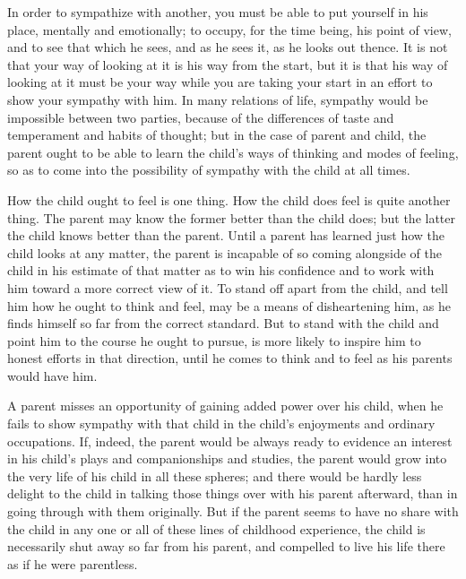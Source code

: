 \documentclass[
]{book}
\begin{document}
In order to sympathize with another, you must be able to put yourself in his place, mentally and emotionally; to occupy, for the time being, his point of view, and to see that which he sees, and as he sees it, as he looks out thence. It is not that your way of looking at it is his way from the start, but it is that his way of looking at it must be your way while you are taking your start in an effort to show your sympathy with him. In many relations of life, sympathy would be impossible between two parties, because of the differences of taste and temperament and habits of thought; but in the case of parent and child, the parent ought to be able to learn the child's ways of thinking and modes of feeling, so as to come into the possibility of sympathy with the child at all times.

How the child ought to feel is one thing. How the child does feel is quite another thing. The parent may know the former better than the child does; but the latter the child knows better than the parent. Until a parent has learned just how the child looks at any matter, the parent is incapable of so coming alongside of the child in his estimate of that matter as to win his confidence and to work with him toward a more correct view of it. To stand off apart from the child, and tell him how he ought to think and feel, may be a means of disheartening him, as he finds himself so far from the correct standard. But to stand with the child and point him to the course he ought to pursue, is more likely to inspire him to honest efforts in that direction, until he comes to think and to feel as his parents would have him.

A parent misses an opportunity of gaining added power over his child, when he fails to show sympathy with that child in the child's enjoyments and ordinary occupations. If, indeed, the parent would be always ready to evidence an interest in his child's plays and companionships and studies, the parent would grow into the very life of his child in all these spheres; and there would be hardly less delight to the child in talking those things over with his parent afterward, than in going through with them originally. But if the parent seems to have no share with the child in any one or all of these lines of childhood experience, the child is necessarily shut away so far from his parent, and compelled to live his life there as if he were parentless.
\end{document}
